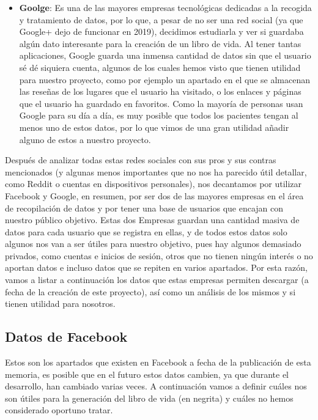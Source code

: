 \begin{itemize}
		\item \textbf{Goolge}: Es una de las mayores empresas tecnológicas dedicadas a la recogida y tratamiento de datos, por lo que, a pesar de no ser una red social (ya que Google+ dejo de funcionar en 2019), decidimos estudiarla y ver si guardaba algún dato interesante para la creación de un libro de vida. Al tener tantas aplicaciones, Google guarda una inmensa cantidad de datos sin que el usuario sé dé siquiera cuenta, algunos de los cuales hemos visto que tienen utilidad para nuestro proyecto, como por ejemplo un apartado en el que se almacenan las reseñas de los lugares que el usuario ha visitado, o los enlaces y páginas que el usuario ha guardado en favoritos. Como la mayoría de personas usan Google para su día a día, es muy posible que todos los pacientes tengan al menos uno de estos datos, por lo que vimos de una gran utilidad añadir alguno de estos a nuestro proyecto.
		
	\end{itemize}


Después de analizar todas estas redes sociales con sus pros y sus contras mencionados (y algunas menos importantes que no nos ha parecido útil detallar, como Reddit o cuentas en dispositivos personales), nos decantamos por utilizar Facebook y Google, en resumen, por ser dos de las mayores empresas en el área de recopilación de datos y por tener una base de usuarios que encajan con nuestro público objetivo. Estas dos Empresas guardan una cantidad masiva de datos para cada usuario que se registra en ellas, y de todos estos datos solo algunos nos van a ser útiles para nuestro objetivo, pues hay algunos demasiado privados, como cuentas e inicios de sesión, otros que no tienen ningún interés o no aportan datos e incluso datos que se repiten en varios apartados. Por esta razón, vamos a listar a continuación los datos que estas empresas permiten descargar (a fecha de la creación de este proyecto), así como un análisis de los mismos y si tienen utilidad para nosotros.


\subsection{Datos de Facebook}

Estos son los apartados que existen en Facebook a fecha de la publicación de esta memoria, es posible que en el futuro estos datos cambien, ya que durante el desarrollo, han cambiado varias veces. A continuación vamos a definir cuáles nos son útiles para la generación del libro de vida (en negrita) y cuáles no hemos considerado oportuno tratar.

